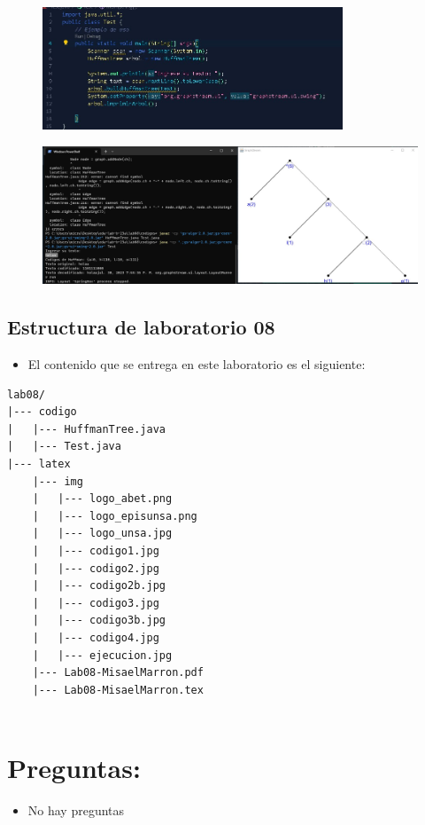 \documentclass{article}
\begin{document}
	\begin{figure}[H]
		\centering
		\includegraphics[width=0.8\textwidth,keepaspectratio]{img/codigo4.jpg}	
	\end{figure}
	\begin{figure}[H]
		\centering
		\includegraphics[width=1\textwidth,keepaspectratio]{img/ejecucion.jpg}	
	\end{figure}
	
	\clearpage
	\subsection{Estructura de laboratorio 08}
	\begin{itemize}	
		\item El contenido que se entrega en este laboratorio es el siguiente:
	\end{itemize}
	
\begin{lstlisting}[style=ascii-tree]
lab08/
|--- codigo
|   |--- HuffmanTree.java
|   |--- Test.java
|--- latex
    |--- img
    |   |--- logo_abet.png
    |   |--- logo_episunsa.png
    |   |--- logo_unsa.jpg
    |   |--- codigo1.jpg
    |   |--- codigo2.jpg
    |   |--- codigo2b.jpg
    |   |--- codigo3.jpg
    |   |--- codigo3b.jpg
    |   |--- codigo4.jpg
    |   |--- ejecucion.jpg
    |--- Lab08-MisaelMarron.pdf    
    |--- Lab08-MisaelMarron.tex
    
\end{lstlisting}    

\section{Preguntas: }
	\begin{itemize}
		\item No hay preguntas
	\end{itemize}	
		
\end{document}
